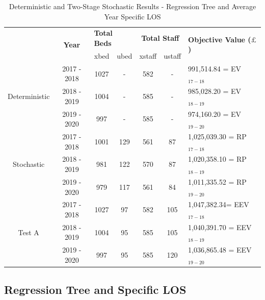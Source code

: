 \documentclass[../thesis.tex]{subfiles}
\begin{document}
\begin{table}[h!]
    \centering
    \begin{tabular}{ccccccl}\toprule
 & \multirow{2}{*}{\textbf{Year}}& \multicolumn{2}{l}{\textbf{Total Beds}} & \multicolumn{2}{c}{\textbf{Total Staff}} & \multirow{2}{*}{\textbf{Objective Value ($\pounds$)}}\\ \cmidrule(lr){3-4} \cmidrule(lr){5-6}
&& xbed           & ubed          & xstaff         & ustaff         \\ \midrule
     \multirow{3}{*}{Deterministic} & 2017 - 2018 & 1027   & - &  582 & - & 991,514.84 =  EV$_{17-18}$ \\ 
      & 2018 - 2019 & 1004 & - &585 &  - &  985,028.20 =  EV$_{18-19}$ \\
      & 2019 - 2020 & 997 & - & 585 & - &   974,160.20 =  EV$_{19-20}$\\ \midrule
     \multirow{3}{*}{Stochastic} & 2017 - 2018 & 1001  & 129  & 561 & 87 & 1,025,039.30  =  RP$_{17-18}$ \\ 
      & 2018 - 2019 & 981 & 122  & 570 & 87 & 1,020,358.10 =  RP$_{18-19}$ \\
      & 2019 - 2020 & 979 & 117 & 561 & 84 & 1,011,335.52 =  RP$_{19-20}$\\ \midrule    
     \multirow{3}{*}{Test A} & 2017 - 2018 & 1027  & 97 &  582 & 105 & 1,047,382.34=  EEV$_{17-18}$ \\ 
      & 2018 - 2019& 1004 & 95 & 585 & 105 &1,040,391.70 =  EEV$_{18-19}$ \\
      & 2019 - 2020 & 997 & 95 & 585  & 120 & 1,036,865.48 =  EEV$_{19-20}$\\ \bottomrule       
    \end{tabular}
    \caption{Deterministic and Two-Stage Stochastic Results - Regression Tree and Average Year Specific LOS}
    \label{tab:Results3}
\end{table}


\newpage



\subsection{Regression Tree and Specific LOS}
\end{document}
